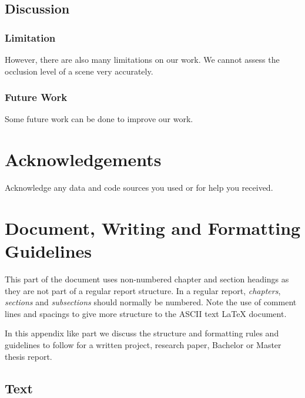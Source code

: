 \documentclass[11pt, a4paper,oneside,chapterprefix=false]{scrbook}
\begin{document}
\section{Discussion}

\subsection{Limitation}

However, there are also many limitations on our work. We cannot assess the occlusion level of a scene very accurately.

\subsection{Future Work}

Some future work can be done to improve our work.

\chapter{Acknowledgements} \label{chp:acknowledgements}

Acknowledge any data and code sources you used or for help you received.


\chapter*{Document, Writing and Formatting Guidelines}

This part of the document uses non-numbered chapter and section headings as they are not part of a regular report structure. In a regular report, \textit{chapters}, \textit{sections} and \textit{subsections} should normally be numbered. Note the use of comment lines and spacings to give more structure to the ASCII text LaTeX document.

In this appendix like part we discuss the structure and formatting rules and guidelines to follow for a written project, research paper, Bachelor or Master thesis report.

\section*{Text} \label{sec:text}
\end{document}
